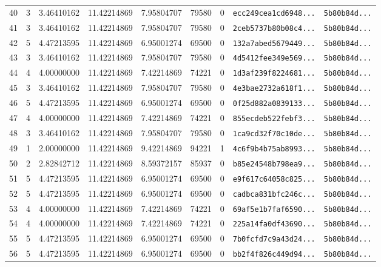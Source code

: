 \documentclass[10pt]{article}
\begin{document}
\begin{longtable}{rrrrrrrll}
  40 & 3 & 3.46410162 & 11.42214869 & 7.95804707 & 79580 & 0 & \texttt{ecc249cea1cd6948...} & \texttt{5b80b84d...} \\
  41 & 3 & 3.46410162 & 11.42214869 & 7.95804707 & 79580 & 0 & \texttt{2ceb5737b80b08c4...} & \texttt{5b80b84d...} \\
  42 & 5 & 4.47213595 & 11.42214869 & 6.95001274 & 69500 & 0 & \texttt{132a7abed5679449...} & \texttt{5b80b84d...} \\
  43 & 3 & 3.46410162 & 11.42214869 & 7.95804707 & 79580 & 0 & \texttt{4d5412fee349e569...} & \texttt{5b80b84d...} \\
  44 & 4 & 4.00000000 & 11.42214869 & 7.42214869 & 74221 & 0 & \texttt{1d3af239f8224681...} & \texttt{5b80b84d...} \\
  45 & 3 & 3.46410162 & 11.42214869 & 7.95804707 & 79580 & 0 & \texttt{4e3bae2732a618f1...} & \texttt{5b80b84d...} \\
  46 & 5 & 4.47213595 & 11.42214869 & 6.95001274 & 69500 & 0 & \texttt{0f25d882a0839133...} & \texttt{5b80b84d...} \\
  47 & 4 & 4.00000000 & 11.42214869 & 7.42214869 & 74221 & 0 & \texttt{855ecdeb522febf3...} & \texttt{5b80b84d...} \\
  48 & 3 & 3.46410162 & 11.42214869 & 7.95804707 & 79580 & 0 & \texttt{1ca9cd32f70c10de...} & \texttt{5b80b84d...} \\
  \rowcolor{cmpink!20} 49 & 1 & 2.00000000 & 11.42214869 & 9.42214869 & 94221 & 1 & \texttt{4c6f9b4b75ab8993...} & \texttt{5b80b84d...} \\
  50 & 2 & 2.82842712 & 11.42214869 & 8.59372157 & 85937 & 0 & \texttt{b85e24548b798ea9...} & \texttt{5b80b84d...} \\
  51 & 5 & 4.47213595 & 11.42214869 & 6.95001274 & 69500 & 0 & \texttt{e9f617c64058c825...} & \texttt{5b80b84d...} \\
  52 & 5 & 4.47213595 & 11.42214869 & 6.95001274 & 69500 & 0 & \texttt{cadbca831bfc246c...} & \texttt{5b80b84d...} \\
  53 & 4 & 4.00000000 & 11.42214869 & 7.42214869 & 74221 & 0 & \texttt{69af5e1b7faf6590...} & \texttt{5b80b84d...} \\
  54 & 4 & 4.00000000 & 11.42214869 & 7.42214869 & 74221 & 0 & \texttt{225a14fa0df43690...} & \texttt{5b80b84d...} \\
  55 & 5 & 4.47213595 & 11.42214869 & 6.95001274 & 69500 & 0 & \texttt{7b0fcfd7c9a43d24...} & \texttt{5b80b84d...} \\
  56 & 5 & 4.47213595 & 11.42214869 & 6.95001274 & 69500 & 0 & \texttt{bb2f4f826c449d94...} & \texttt{5b80b84d...} \\

\end{longtable}
\end{document}
